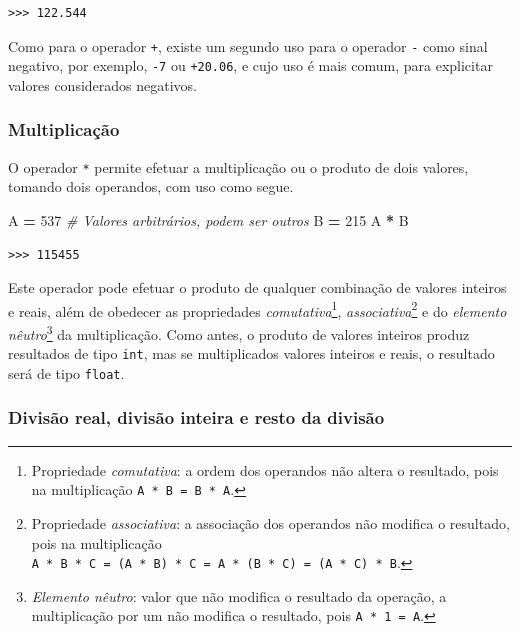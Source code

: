 \documentclass[
]{book}
\newenvironment{Shaded}{\begin{snugshade}}{\end{snugshade}}
\newcommand{\CommentTok}[1]{\textcolor[rgb]{0.56,0.35,0.01}{\textit{#1}}}
\newcommand{\DecValTok}[1]{\textcolor[rgb]{0.00,0.00,0.81}{#1}}
\newcommand{\NormalTok}[1]{#1}
\newcommand{\OperatorTok}[1]{\textcolor[rgb]{0.81,0.36,0.00}{\textbf{#1}}}
\begin{document}
\begin{verbatim}
>>> 122.544
\end{verbatim}

Como para o operador \texttt{+}, existe um segundo uso para o operador \texttt{-} como sinal negativo, por exemplo, \texttt{-7} ou \texttt{+20.06}, e cujo uso é mais comum, para explicitar valores considerados negativos.

\hypertarget{multiplicauxe7uxe3o}{%
\subsubsection{Multiplicação}\label{multiplicauxe7uxe3o}}

O operador \texttt{*} permite efetuar a multiplicação ou o produto de dois valores, tomando dois operandos, com uso como segue.

\begin{Shaded}
\begin{Highlighting}[]
\NormalTok{A }\OperatorTok{=} \DecValTok{537} \CommentTok{\# Valores arbitrários, podem ser outros}
\NormalTok{B }\OperatorTok{=} \DecValTok{215}
\NormalTok{A }\OperatorTok{*}\NormalTok{ B}
\end{Highlighting}
\end{Shaded}

\begin{verbatim}
>>> 115455
\end{verbatim}

Este operador pode efetuar o produto de qualquer combinação de valores inteiros e reais, além de obedecer as propriedades \emph{comutativa}\footnote{Propriedade \emph{comutativa}: a ordem dos operandos não altera o resultado, pois na multiplicação
  \texttt{A\ *\ B\ =\ B\ *\ A}.}, \emph{associativa}\footnote{Propriedade \emph{associativa}: a associação dos operandos não modifica o resultado, pois na multiplicação
  \texttt{A\ *\ B\ *\ C\ =\ (A\ *\ B)\ *\ C\ =\ A\ *\ (B\ *\ C)\ =\ (A\ *\ C)\ *\ B}.} e do \emph{elemento nêutro}\footnote{\emph{Elemento nêutro}: valor que não modifica o resultado da operação, a multiplicação por um não modifica o resultado, pois \texttt{A\ *\ 1\ =\ A}.} da multiplicação. Como antes, o produto de valores inteiros produz resultados de tipo \texttt{int}, mas se multiplicados valores inteiros e reais, o resultado será de tipo \texttt{float}.

\hypertarget{divisuxe3o-real-divisuxe3o-inteira-e-resto-da-divisuxe3o}{%
\subsubsection{Divisão real, divisão inteira e resto da divisão}\label{divisuxe3o-real-divisuxe3o-inteira-e-resto-da-divisuxe3o}}
\end{document}
